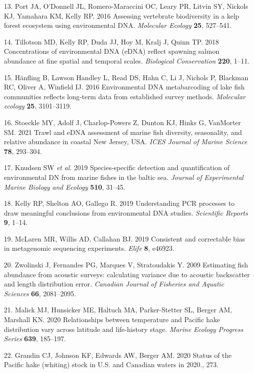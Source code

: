 \documentclass[
]{article}
\begin{document}
13. Port JA, O'Donnell JL, Romero-Maraccini OC, Leary PR, Litvin SY,
Nickols KJ, Yamahara KM, Kelly RP. 2016 Assessing vertebrate
biodiversity in a kelp forest ecosystem using environmental DNA.
\emph{Molecular Ecology} \textbf{25}, 527--541.

14. Tillotson MD, Kelly RP, Duda JJ, Hoy M, Kralj J, Quinn TP. 2018
Concentrations of environmental DNA (eDNA) reflect spawning salmon
abundance at fine spatial and temporal scales. \emph{Biological
Conservation} \textbf{220}, 1--11.

15. Hänfling B, Lawson Handley L, Read DS, Hahn C, Li J, Nichols P,
Blackman RC, Oliver A, Winfield IJ. 2016 Environmental DNA metabarcoding
of lake fish communities reflects long-term data from established survey
methods. \emph{Molecular ecology} \textbf{25}, 3101--3119.

16. Stoeckle MY, Adolf J, Charlop-Powers Z, Dunton KJ, Hinks G,
VanMorter SM. 2021 Trawl and eDNA assessment of marine fish diversity,
seasonality, and relative abundance in coastal New Jersey, USA.
\emph{ICES Journal of Marine Science} \textbf{78}, 293--304.

17. Knudsen SW \emph{et al.} 2019 Species-specific detection and
quantification of environmental DN from marine fishes in the baltic
sea. \emph{Journal of Experimental Marine Biology and Ecology}
\textbf{510}, 31--45.

18. Kelly RP, Shelton AO, Gallego R. 2019 Understanding PCR processes to
draw meaningful conclusions from environmental DNA studies.
\emph{Scientific Reports} \textbf{9}, 1--14.

19. McLaren MR, Willis AD, Callahan BJ. 2019 Consistent and correctable
bias in metagenomic sequencing experiments. \emph{Elife} \textbf{8},
e46923.

20. Zwolinski J, Fernandes PG, Marques V, Stratoudakis Y. 2009
Estimating fish abundance from acoustic surveys: calculating variance
due to acoustic backscatter and length distribution error.
\emph{Canadian Journal of Fisheries and Aquatic Sciences} \textbf{66},
2081--2095.

21. Malick MJ, Hunsicker ME, Haltuch MA, Parker-Stetter SL, Berger AM,
Marshall KN. 2020 Relationships between temperature and Pacific hake
distribution vary across latitude and life-history stage. \emph{Marine
Ecology Progress Series} \textbf{639}, 185--197.

22. Grandin CJ, Johnson KF, Edwards AW, Berger AM. 2020 Status of the
Pacific hake (whiting) stock in U.S. and Canadian waters in 2020., 273.
\end{document}
